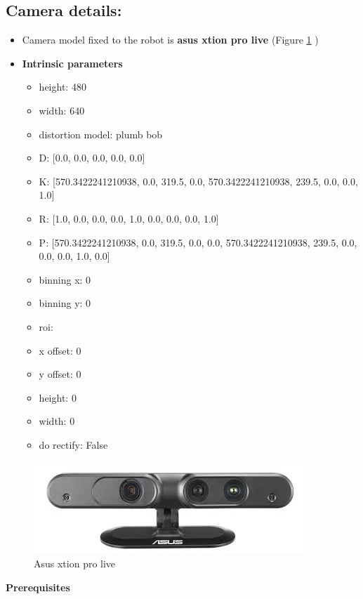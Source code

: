 \documentclass{article}
\begin{document}
\subsection{Camera details:}
\begin{itemize}
\item Camera model fixed to the robot is \textbf{asus xtion pro live} (Figure \ref{fig:camera} )
\item \textbf{Intrinsic parameters}




\begin{itemize}
\item height: 480
\item width: 640
\item distortion model: plumb bob
\item D: [0.0, 0.0, 0.0, 0.0, 0.0]
\item K: [570.3422241210938, 0.0, 319.5, 0.0, 570.3422241210938, 239.5, 0.0, 0.0, 1.0]
\item R: [1.0, 0.0, 0.0, 0.0, 1.0, 0.0, 0.0, 0.0, 1.0]
\item P: [570.3422241210938, 0.0, 319.5, 0.0, 0.0, 570.3422241210938, 239.5, 0.0, 0.0, 0.0, 1.0, 0.0]
\item binning x: 0
\item binning y: 0
\item roi:
\item x offset: 0
\item y offset: 0
\item height: 0
\item width: 0
\item do rectify: False
\end{itemize} 
\end{itemize}

\begin{figure}[h!]
\centering
\includegraphics[scale=0.5]{images/camera.jpeg}
\caption{Asus xtion pro live}
\label{fig:camera}
\end{figure}


\newpage


\textbf{Prerequisites}\\
\end{document}
